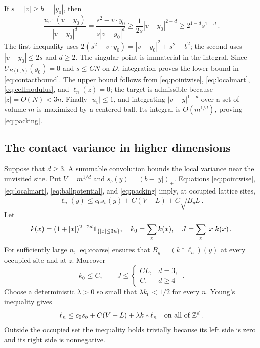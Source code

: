 If $s=|v|\geq b=|y_0|$, then
\[
 \frac{u_v\cdot(v-y_0)}{|v-y_0|^d}
 =\frac{s^2-v\cdot y_0}{s|v-y_0|^d}
 \geq\frac1{2s}|v-y_0|^{2-d}
 \geq 2^{1-d}s^{1-d}\, .
\]
The first inequality uses
$2(s^2-v\cdot y_0)=|v-y_0|^2+s^2-b^2$; the second uses
$|v-y_0|\leq2s$ and $d\geq2$.
The singular point is immaterial in the integral. Since
$U_{B(0,b)}(y_0)=0$ and $s\leq CN$ on $D$, integration proves
the lower bound in \eqref{eq:contactbound}. The upper bound follows
from \eqref{eq:pointwise}, \eqref{eq:localmart}, \eqref{eq:cellmodulus}, and
$\ell_n(z)=0$; the target is admissible because $|z|=O(N)<3n$. Finally $|u_v|\leq1$, and integrating
$|v-y|^{1-d}$ over a set of volume $m$ is maximized by a centered ball.
Its integral is $O(m^{1/d})$, proving \eqref{eq:packing}.



\subsection{The contact variance in higher dimensions}
Suppose that $d\geq3$. A summable convolution bounds the local variance
near the unvisited site.
Put $V=m^{1/d}$ and $s_b(y)=(b-|y|)_+$. Equations
\eqref{eq:pointwise}, \eqref{eq:localmart}, \eqref{eq:ballpotential}, and
\eqref{eq:packing} imply, at occupied lattice sites,
\[
 \ell_n(y)\leq c_0s_b(y)+C(V+L)+C\sqrt{B_yL}\, .
\]
Let
\[
 k(x)=(1+|x|)^{2-2d}\mathbf 1_{\{|x|\leq3n\}},\quad
 k_0=\sum_xk(x),\quad J=\sum_x|x|k(x)\, .
\]
For sufficiently large $n$, \eqref{eq:coarse} ensures that
$B_y=(k*\ell_n)(y)$ at every occupied site and at $z$.
Moreover
\begin{equation}\label{eq:kernelmoments}
 k_0\leq C,\qquad
 J\leq\begin{cases}CL,&d=3,\\C,&d\geq4\end{cases}\, .
\end{equation}
Choose a deterministic $\lambda>0$ so small that
$\lambda k_0<1/2$ for every $n$. Young's inequality gives
\begin{equation}\label{eq:resolvent}
 \ell_n\leq c_0s_b+C(V+L)+\lambda k*\ell_n
 \quad\hbox{on all of }\mathbb Z^d\, .
\end{equation}
Outside the occupied set the inequality holds trivially because its
left side is zero and its right side is nonnegative.

